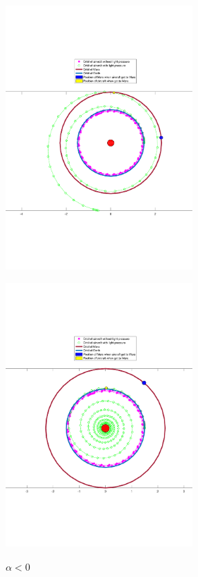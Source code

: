 \documentclass[../Paper.tex]{subfiles}
\begin{document}
\begin{figure}[H]
 \begin{minipage}[t]{0.5\linewidth}
 \centering{}
 \includegraphics[width=7cm]{../Figures/alphadayu0.pdf}
 \label{fig:orbitlegend}
 \caption{$\alpha > 0$}
 \end{minipage}
 \begin{minipage}[t]{0.5\linewidth}
 \centering{}
 \includegraphics[width=7cm]{../Figures/alphaxiaoyu0.pdf}
 \label{fig:orbit1}
\caption{$\alpha < 0$}
 \end{minipage}
\end{figure}
\end{document}
